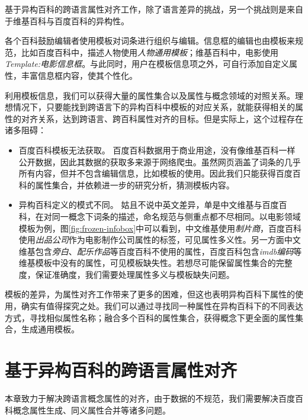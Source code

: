 基于异构百科的跨语言属性对齐工作，除了语言差异的挑战，另一个挑战则是来自于维基百科与百度百科的异构性。

各个百科鼓励编辑者使用模板对词条进行组织与编辑。信息框的编辑也由模板来规范，比如百度百科中，描述人物使用\textit{人物通用模板}；维基百科中，电影使用\textit{Template:电影信息框}。与此同时，用户在模板信息项之外，可自行添加自定义属性，丰富信息框内容，使其个性化。

利用模板信息，我们可以获得大量的属性集合以及属性与概念领域的对照关系。理想情况下，只要能找到跨语言下的异构百科中模板的对应关系，就能获得相关的属性的对齐关系，达到跨语言、跨百科属性对齐的目标。但是实际上，这个过程存在诸多阻碍：
\begin{itemize}
\item {\heiti 百度百科模板无法获取。} 百度百科数据用于商业用途，没有像维基百科一样公开数据，因此其数据的获取多来源于网络爬虫。虽然网页涵盖了词条的几乎所有内容，但并不包含编辑信息，比如模板的使用。因此我们只能获得百度百科的属性集合，并依赖进一步的研究分析，猜测模板内容。
\item {\heiti 异构百科定义的模式不同。} 姑且不说中英文差异，单是中文维基与百度百科，在对同一概念下词条的描述，命名规范与侧重点都不尽相同。以电影领域模板为例，图\ref{fig:frozen-infobox}中可以看到，中文维基使用\textit{制片商}，百度百科使用\textit{出品公司}作为电影制作公司属性的标签，可见{\heiti 属性多义性}。另一方面中文维基包含\textit{旁白}、\textit{配乐作品}等百度百科不使用的属性，百度百科包含\textit{imdb编码}等维基模板中没有的属性，可见{\heiti 模板缺失性}。若想尽可能保留属性集合的完整度，保证准确度，我们需要处理属性多义与模板缺失问题。
\end{itemize}

模板的差异，为属性对齐工作带来了更多的困难，但这也表明异构百科下属性的使用，确实有值得探究之处。我们可以通过寻找同一种属性在异构百科下的不同表达方式，寻找相似属性名称；融合多个百科的属性集合，获得概念下更全面的属性集合，生成通用模板。

\section{基于异构百科的跨语言属性对齐}
\label{sec:property-matching}

本章致力于解决跨语言概念属性的对齐，由于数据的不规范，我们需要解决百度百科概念属性生成、同义属性合并等诸多问题。


